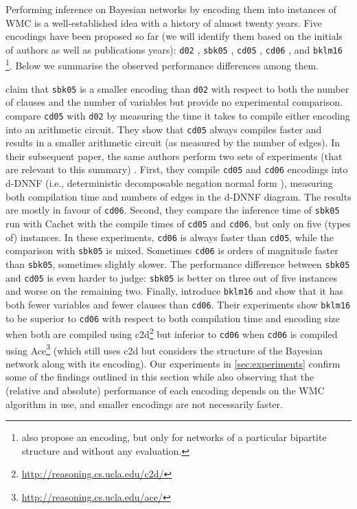 \documentclass{uai2021} %
\theoremstyle{definition}
\begin{document}
Performing inference on Bayesian networks by encoding them into instances of WMC
is a well-established idea with a history of almost twenty years. Five encodings
have been proposed so far (we will identify them based on the initials of
authors as well as publications years): \texttt{d02}
\citep{DBLP:conf/kr/Darwiche02}, \texttt{sbk05} \citep{DBLP:conf/aaai/SangBK05},
\texttt{cd05} \citep{DBLP:conf/ijcai/ChaviraD05}, \texttt{cd06}
\citep{DBLP:conf/sat/ChaviraD06}, and \texttt{bklm16}
\citep{DBLP:conf/ecai/BartKLM16}\footnote{\citet{DBLP:conf/scai/VomlelT13} also
  propose an encoding, but only for networks of a particular bipartite structure
  and without any evaluation.}. Below we summarise the observed performance
differences among them.

\citet{DBLP:conf/aaai/SangBK05} claim that
\texttt{sbk05} is a smaller encoding than \texttt{d02} with respect to both the
number of clauses and the number of variables but provide no experimental
comparison. \citet{DBLP:conf/ijcai/ChaviraD05} compare \texttt{cd05} with
\texttt{d02} by measuring the time it takes to compile either encoding into an
arithmetic circuit. They show that
\texttt{cd05} always compiles faster and results in a smaller arithmetic circuit
(as measured by the number of edges). In their subsequent paper, the same
authors perform two sets of experiments (that are relevant to this summary)
\citep{DBLP:conf/sat/ChaviraD06}. First, they compile \texttt{cd05} and
\texttt{cd06} encodings into d-DNNF (i.e., deterministic decomposable negation
normal form \citep{DBLP:journals/jancl/Darwiche01}), measuring both compilation
time and numbers of edges in the d-DNNF diagram. The results are mostly in
favour of \texttt{cd06}. Second, they compare the inference time of
\texttt{sbk05} run with \textsf{Cachet} \citep{DBLP:conf/sat/SangBBKP04} with
the compile times of \texttt{cd05} and \texttt{cd06}, but only on five (types
of) instances. In these experiments, \texttt{cd06} is always faster than
\texttt{cd05}, while the comparison with \texttt{sbk05} is mixed. Sometimes
\texttt{cd06} is orders of magnitude faster than \texttt{sbk05}, sometimes
slightly slower. The performance difference between \texttt{sbk05} and
\texttt{cd05} is even harder to judge: \texttt{sbk05} is better on three out of
five instances and worse on the remaining two. Finally,
\citet{DBLP:conf/ecai/BartKLM16} introduce \texttt{bklm16} and show that it has
both fewer variables and fewer clauses than \texttt{cd06}. Their experiments
show \texttt{bklm16} to be superior to \texttt{cd06} with respect to both
compilation time and encoding size when both are compiled using
\textsf{c2d}\footnote{\url{http://reasoning.cs.ucla.edu/c2d/}}
\citep{DBLP:conf/ecai/Darwiche04} but inferior to \texttt{cd06} when
\texttt{cd06} is compiled using
\textsf{Ace}\footnote{\url{http://reasoning.cs.ucla.edu/ace/}} (which still uses
\textsf{c2d} but considers the structure of the Bayesian network along with its
encoding). Our experiments in \cref{sec:experiments} confirm some of the
findings outlined in this section while also observing that the (relative and
absolute) performance of each encoding depends on the WMC algorithm in use, and
smaller encodings are not necessarily faster.
\end{document}
